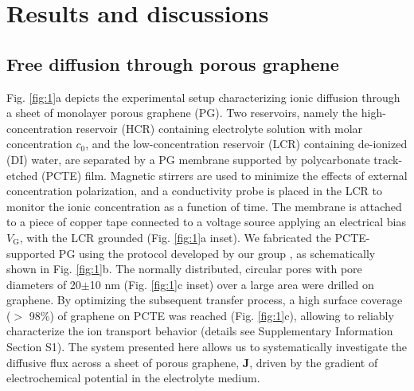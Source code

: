 \documentclass[journal=langd5,email=true, hyperref=true, keywords=false]{achemso}
\newcommand{\Fig}{Fig.}
\begin{document}
\section{Results and discussions}
\label{sec:res}

\subsection{Free diffusion through porous graphene}
\label{sec:res-1}

\Fig{} \ref{fig:1}a depicts the experimental setup characterizing
ionic diffusion through a sheet of monolayer porous graphene (PG). Two
reservoirs, namely the high-concentration reservoir (HCR) containing
electrolyte solution with molar concentration $c_0$, and the
low-concentration reservoir (LCR) containing de-ionized (DI) water,
are separated by a PG membrane supported by polycarbonate track-etched
(PCTE) film. Magnetic stirrers are used to minimize the effects of
external concentration polarization, and a conductivity probe is
placed in the LCR to monitor the ionic concentration as a function of
time. The membrane is attached to a piece of copper tape connected to
a voltage source applying an electrical bias $V_{\mathrm{G}}$, with
the LCR grounded (\Fig{} \ref{fig:1}a inset). We fabricated the
PCTE-supported PG using the protocol developed by our group
\cite{Choi_2018}, as schematically shown in \Fig{} \ref{fig:1}b. The
normally distributed, circular pores with pore diameters of 20$\pm$10
nm (\Fig{} \ref{fig:1}c inset) over a large area were drilled on
graphene.  By optimizing the subsequent transfer process, a high
surface coverage ($>$ 98\%) of graphene on PCTE was reached (\Fig{}
\ref{fig:1}c), allowing to reliably characterize the ion transport
behavior (details see Supplementary Information Section S1).  The
system presented here allows us to systematically investigate the
diffusive flux across a sheet of porous graphene, $\boldsymbol{J}$,
driven by the gradient of electrochemical potential in the electrolyte
medium.
\end{document}
